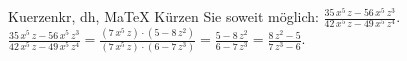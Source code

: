 \begin{MAufgabe}{Kuerzen}{kr, dh, MaTeX}
K\"urzen Sie soweit m\"oglich: $\frac{35\, x^5\, z - 56\, x^5\, z^3}{42\, x^5\, z - 49\, x^5\, z^4}$.\\ 
\ifLsg\MLoesung
\quad $\frac{35\, x^5\, z - 56\, x^5\, z^3}{42\, x^5\, z - 49\, x^5\, z^4}=\frac{(7\, x^5\, z)\cdot(5 - 8\, z^2)}{(7\, x^5\, z)\cdot(6 - 7\, z^3)}=\frac{5 - 8\, z^2}{6 - 7\, z^3}=\frac{8\, z^2 - 5}{7\, z^3 - 6}$.\else\relax\fi
 \end{MAufgabe}